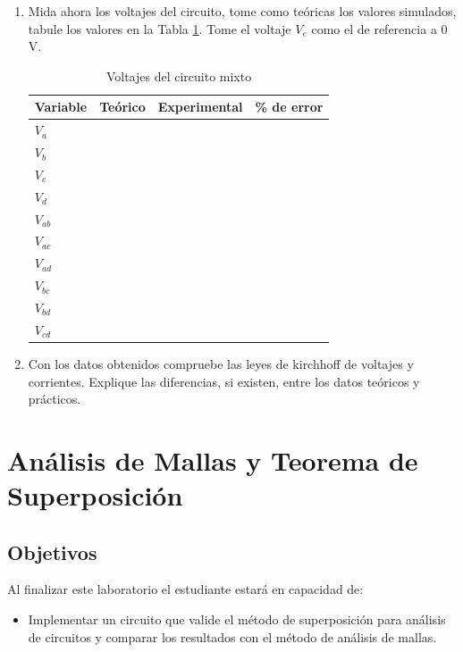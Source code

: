 \documentclass{report}
\newcommand{\obj}{Objetivos}
\newcommand{\capacidad}{Al finalizar este laboratorio el estudiante estará en capacidad de:}
\begin{document}
\begin{enumerate}
\item Mida ahora los voltajes del circuito, tome como teóricas los valores
simulados, tabule los valores en la Tabla \ref{tab:L5T2}. Tome el voltaje $V_e$ como el de referencia a 0 V.

\begin{table}[H]
	\caption{Voltajes del circuito mixto}
	\label{tab:L5T2}
	\centering
	\begin{tabular}[t]{| >{\centering\arraybackslash}m{2cm} | >{\centering\arraybackslash}m{2cm} |
	>{\centering\arraybackslash}m{2cm} | >{\centering\arraybackslash}m{2cm} |}
		\hline
		Variable & Teórico & Experimental & \% de error\\
		\hline
		$V_a$ & & & \\
		\hline
		$V_b$ & & & \\
		\hline
		$V_c$ & & & \\
		\hline
		$V_d$ & & & \\
		\hline				
		$V_{ab}$ & & & \\
		\hline
		$V_{ac}$ & & & \\
		\hline		
		$V_{ad}$ & & & \\
		\hline
		$V_{bc}$ & & & \\
		\hline
		$V_{bd}$ & & & \\
		\hline
		$V_{cd}$ & & & \\
		\hline					
	\end{tabular}
\end{table}
\item Con los datos obtenidos compruebe las leyes de kirchhoff de voltajes y
corrientes. Explique las diferencias, si existen, entre los datos teóricos y
prácticos.
\end{enumerate}

\chapter{Análisis de Mallas y Teorema de Superposición}

\section{\obj}
\capacidad
\begin{itemize}
\item Implementar un circuito que valide el método de superposición para análisis
de circuitos y comparar los resultados con el método de análisis de mallas.
\end{itemize}
\end{document}
